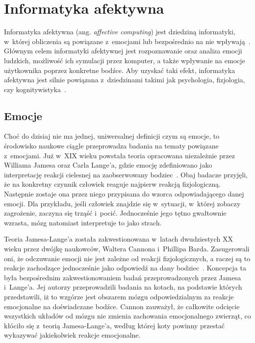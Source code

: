 \chapter{Informatyka afektywna}
\label{cha:affectiveComputing}

Informatyka afektywna (ang. \textit{affective computing}) jest dziedziną informatyki, w~której obliczenia są powiązane z~emocjami lub bezpośrednio na nie wpływają~\cite{Picard:1997:AC:265013}. Głównym celem informatyki afektywnej jest rozpoznawanie oraz analiza emocji ludzkich, możliwość ich symulacji przez komputer, a także wpływanie na emocje użytkownika poprzez konkretne bodźce. Aby uzyskać taki efekt, informatyka afektywna jest silnie powiązana z~dziedzinami takimi jak psychologia, fizjologia, czy kognitywistyka~\cite{affective_computing_review_tao_tieniu}.

\section{Emocje}
Choć do dzisiaj nie ma jednej, uniwersalnej definicji czym są emocje, to środowisko naukowe ciągle przeprowadza badania na tematy powiązane z~emocjami. Już w~XIX wieku powstała teoria opracowana niezależnie przez Williama Jamesa oraz Carla Lange'a, gdzie emocję zdefiniowano jako interpretację reakcji cielesnej na zaobserwowany bodziec~\cite{Coleman2011}. Obaj badacze przyjęli, że na konkretny czynnik człowiek reaguje najpierw reakcją fizjologiczną. Następnie zostaje ona przez niego przypisana do wzorca odpowiadającego danej emocji. Dla przykładu, jeśli człowiek znajdzie się w~sytuacji, w~której zobaczy zagrożenie, zaczyna się trząść i~pocić. Jednocześnie jego tętno gwałtownie wzrasta, mózg natomiast interpretuje to jako strach.

Teoria Jamesa-Lange'a została zakwestionowana w~latach dwudziestych XX wieku przez dwójkę naukowców, Waltera Cannona i~Phillipa Barda. Zasugerowali oni, że odczuwanie emocji nie jest zależne od reakcji fizjologicznych, a raczej są to reakcje zachodzące jednocześnie jako odpowiedź na dany bodziec~\cite{cannon_1927}. Koncepcja ta była bezpośrednim zakwestionowaniem badań przeprowadzonych przez Jamesa i~Lange'a. Jej autorzy przeprowadzili badania na kotach, na podstawie których przedstawili, iż to wzgórze jest obszarem mózgu odpowiedzialnym za reakcje emocjonalne na doświadczane bodźce. Cannon zauważył, że całkowite odcięcie wszystkich układów od mózgu nie zmienia zachowania emocjonalnego zwierząt, co kłóciło się z~teorią Jamesa-Lange'a, według której koty powinny przestać wykazywać jakiekolwiek reakcje emocjonalne.

